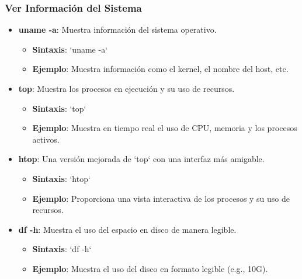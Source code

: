 \documentclass{beamer}
\begin{document}
\begin{frame}
\frametitle{Ver Información del Sistema}
\begin{itemize}
    \item \textbf{uname -a}: Muestra información del sistema operativo.
    \begin{itemize}
        \item \textbf{Sintaxis}: `uname -a`
        \item \textbf{Ejemplo}: Muestra información como el kernel, el nombre del host, etc.
    \end{itemize}
    \item \textbf{top}: Muestra los procesos en ejecución y su uso de recursos.
    \begin{itemize}
        \item \textbf{Sintaxis}: `top`
        \item \textbf{Ejemplo}: Muestra en tiempo real el uso de CPU, memoria y los procesos activos.
    \end{itemize}
    \item \textbf{htop}: Una versión mejorada de `top` con una interfaz más amigable.
    \begin{itemize}
        \item \textbf{Sintaxis}: `htop`
        \item \textbf{Ejemplo}: Proporciona una vista interactiva de los procesos y su uso de recursos.
    \end{itemize}
    \item \textbf{df -h}: Muestra el uso del espacio en disco de manera legible.
    \begin{itemize}
        \item \textbf{Sintaxis}: `df -h`
        \item \textbf{Ejemplo}: Muestra el uso del disco en formato legible (e.g., 10G).
    \end{itemize}
    
\end{itemize}
\end{frame}
\end{document}

